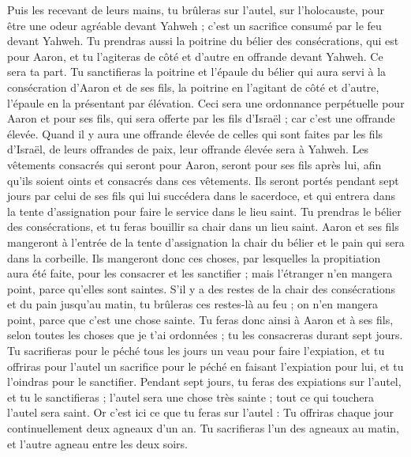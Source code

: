 \begin{multicols}{2}
Puis les recevant de leurs mains, tu brûleras sur l'autel, sur l'holocauste, pour être une odeur agréable devant Yahweh ; c'est un sacrifice consumé par le feu devant Yahweh.
Tu prendras aussi la poitrine du bélier des consécrations, qui est pour Aaron, et tu l’agiteras de côté et d’autre en offrande devant Yahweh. Ce sera ta part.
Tu sanctifieras la poitrine et l’épaule du bélier qui aura servi à la consécration d’Aaron et de ses fils, la poitrine en l’agitant de côté et d’autre, l’épaule en la présentant par élévation.
Ceci sera une ordonnance perpétuelle pour Aaron et pour ses fils, qui sera offerte par les fils d'Israël ; car c'est une offrande élevée. Quand il y aura une offrande élevée de celles qui sont faites par les fils d'Israël, de leurs offrandes de paix, leur offrande élevée sera à Yahweh.
Les vêtements consacrés qui seront pour Aaron, seront pour ses fils après lui, afin qu'ils soient oints et consacrés dans ces vêtements.
Ils seront portés pendant sept jours par celui de ses fils qui lui succédera dans le sacerdoce, et qui entrera dans la tente d’assignation pour faire le service dans le lieu saint.
Tu prendras le bélier des consécrations, et tu feras bouillir sa chair dans un lieu saint.
Aaron et ses fils mangeront à l'entrée de la tente d'assignation la chair du bélier et le pain qui sera dans la corbeille.
Ils mangeront donc ces choses, par lesquelles la propitiation aura été faite, pour les consacrer et les sanctifier ; mais l'étranger n'en mangera point, parce qu'elles sont saintes.
S'il y a des restes de la chair des consécrations et du pain jusqu’au matin, tu brûleras ces restes-là au feu ; on n'en mangera point, parce que c'est une chose sainte.
Tu feras donc ainsi à Aaron et à ses fils, selon toutes les choses que je t'ai ordonnées ; tu les consacreras durant sept jours.
Tu sacrifieras pour le péché tous les jours un veau pour faire l’expiation, et tu offriras pour l'autel un sacrifice pour le péché en faisant l’expiation pour lui, et tu l'oindras pour le sanctifier.
Pendant sept jours, tu feras des expiations sur l'autel, et tu le sanctifieras ; l'autel sera une chose très sainte ; tout ce qui touchera l'autel sera saint.
Or c'est ici ce que tu feras sur l'autel : Tu offriras chaque jour continuellement deux agneaux d'un an.
Tu sacrifieras l'un des agneaux au matin, et l'autre agneau entre les deux soirs.

\end{multicols}
